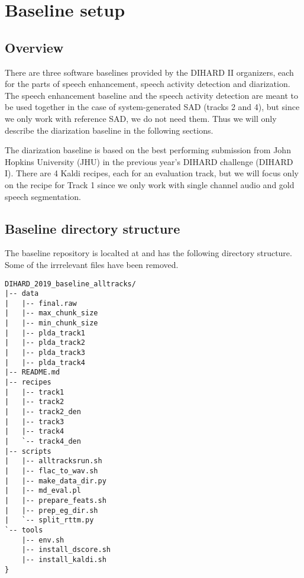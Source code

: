 \chapter{Baseline setup}

\section{Overview}
There are three software baselines provided by the DIHARD II organizers, each for the parts of speech enhancement, speech activity detection and diarization. The speech enhancement baseline and the speech activity detection are meant to be used together in the case of system-generated SAD (tracks 2 and 4), but since we only work with reference SAD, we do not need them. Thus we will only describe the diarization baseline in the following sections.

The diarization baseline is based on the best performing submission \cite{sell2018diarization} from John Hopkins University (JHU) in the previous year's DIHARD challenge (DIHARD I). There are 4 Kaldi recipes, each for an evaluation track, but we will focus only on the recipe for Track 1 since we only work with single channel audio and gold speech segmentation.

\section{Baseline directory structure}
The baseline repository is localted at  and has the following directory structure. Some of the irrrelevant files have been removed.

\begin{verbatim}
DIHARD_2019_baseline_alltracks/
|-- data
|   |-- final.raw
|   |-- max_chunk_size
|   |-- min_chunk_size
|   |-- plda_track1
|   |-- plda_track2
|   |-- plda_track3
|   |-- plda_track4
|-- README.md
|-- recipes
|   |-- track1
|   |-- track2
|   |-- track2_den
|   |-- track3
|   |-- track4
|   `-- track4_den
|-- scripts
|   |-- alltracksrun.sh
|   |-- flac_to_wav.sh
|   |-- make_data_dir.py
|   |-- md_eval.pl
|   |-- prepare_feats.sh
|   |-- prep_eg_dir.sh
|   `-- split_rttm.py
`-- tools
    |-- env.sh
    |-- install_dscore.sh
    |-- install_kaldi.sh
}
\end{verbatim}


